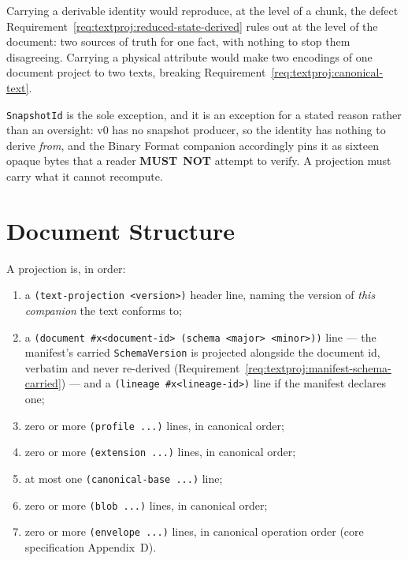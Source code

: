 \documentclass[11pt,letterpaper]{report}
\newcommand{\MUSTNOT}{\textbf{MUST}\nobreak\ \textbf{NOT}}
\begin{document}
\begin{rationale}
  Carrying a derivable identity would reproduce, at the level of a chunk, the
  defect Requirement~\ref{req:textproj:reduced-state-derived} rules out at the
  level of the document: two sources of truth for one fact, with nothing to stop
  them disagreeing. Carrying a physical attribute would make two encodings of one
  document project to two texts, breaking
  Requirement~\ref{req:textproj:canonical-text}.

  \texttt{SnapshotId} is the sole exception, and it is an exception for a stated
  reason rather than an oversight: v0 has no snapshot producer, so the identity
  has nothing to derive \emph{from}, and the Binary Format companion accordingly
  pins it as sixteen opaque bytes that a reader \MUSTNOT{} attempt to verify. A
  projection must carry what it cannot recompute.
\end{rationale}

\section{Document Structure}
\label{sec:content:structure}

A projection is, in order:

\begin{enumerate}
  \item a \texttt{(text-projection <version>)} header line, naming the version of
    \emph{this companion} the text conforms to;
  \item a \texttt{(document \#x<document-id> (schema <major> <minor>))} line ---
    the manifest's carried \texttt{SchemaVersion} is projected alongside the
    document id, verbatim and never re-derived (Requirement~\ref{req:textproj:manifest-schema-carried}) ---
    and a \texttt{(lineage \#x<lineage-id>)} line if the manifest declares one;
  \item zero or more \texttt{(profile ...)} lines, in canonical order;
  \item zero or more \texttt{(extension ...)} lines, in canonical order;
  \item at most one \texttt{(canonical-base ...)} line;
  \item zero or more \texttt{(blob ...)} lines, in canonical order;
  \item zero or more \texttt{(envelope ...)} lines, in canonical operation order
    (core specification Appendix~D).
\end{enumerate}
\end{document}
